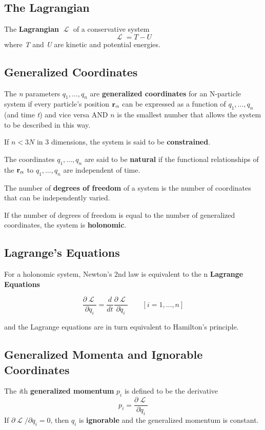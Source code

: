 \documentclass{article}
\DeclareMathOperator{\Lagr}{\mathcal{L}}
\begin{document}
\subsection*{The Lagrangian}
The \textbf{Lagrangian} $\Lagr$ of a conservative system 
$$ \Lagr = T - U $$
where \textit{T} and \textit{U} are kinetic and potential energies.

\subsection*{Generalized Coordinates}
The \textit{n} parameters $q_1, \dots, q_n$ are \textbf{generalized coordinates} for an N-particle system if every particle's position $\vb{r}_\alpha$ can be expressed as a function of $q_1, \dots, q_n$ (and time \textit{t}) and vice versa AND $n$ is the smallest number that allows the system to be described in this way.

If $n  < 3N$ in 3 dimensions, the system is said to be \textbf{constrained}.

The coordinates $q_1, \dots, q_n$ are said to be \textbf{natural} if the functional relationships of the $\vb{r}_\alpha$ to $q_1, \dots, q_n$ are independent of time.

The number of \textbf{degrees of freedom} of a system is the number of coordinates that can be independently varied.

If the number of degrees of freedom is equal to the number of generalized coordinates, the system is \textbf{holonomic}.

\subsection*{Lagrange's Equations}
For a holonomic system, Newton's 2nd law is equivalent to the n \textbf{Lagrange Equations}

$$
\frac{\partial \Lagr}{\partial q_i} = \frac{d}{dt}\frac{\partial \Lagr}{\partial \dot q_i} \qquad [i = 1,\dots,n]
$$

and the Lagrange equations are in turn equivalent to Hamilton's principle.

\subsection*{Generalized Momenta and Ignorable Coordinates}
The \textit{i}th \textbf{generalized momentum} $p_i$ is defined to be the derivative
$$
p_i = \frac{\partial \Lagr}{\partial \dot q_i}
$$
If $\partial \Lagr / \partial q_i = 0$, then $q_i$ is \textbf{ignorable} and the generalized momentum is constant.
\end{document}
